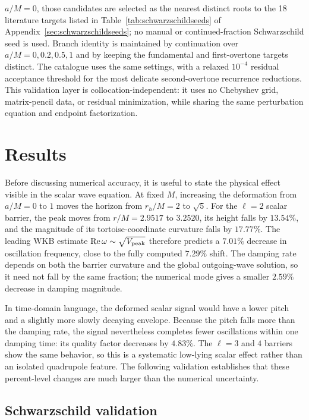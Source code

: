 \documentclass[12pt,a4paper]{article}
\begin{document}
\(a/M=0\), those candidates are selected as the nearest distinct roots to the
18 literature targets listed in Table~\ref{tab:schwarzschildseeds} of
Appendix~\ref{sec:schwarzschildseeds}; no
manual or continued-fraction Schwarzschild seed is used. Branch
identity is maintained by continuation over \(a/M=0,0.2,0.5,1\) and by keeping
the fundamental and first-overtone targets distinct.  The catalogue uses the
same settings, with a relaxed \(10^{-4}\) residual acceptance threshold for the
most delicate second-overtone recurrence reductions. This validation layer is
collocation-independent: it uses no Chebyshev grid, matrix-pencil data, or residual
minimization, while sharing the same perturbation equation and endpoint
factorization.

\section{Results}

Before discussing numerical accuracy, it is useful to state the physical
effect visible in the scalar wave equation.  At fixed \(M\), increasing the
deformation from \(a/M=0\) to \(1\) moves the horizon from \(r_h/M=2\) to
\(\sqrt{5}\).  For the \(\ell=2\) scalar barrier, the peak moves from
\(r/M=2.9517\) to \(3.2520\), its height falls by \(13.54\%\), and the
magnitude of its tortoise-coordinate curvature falls by \(17.77\%\).  The
leading WKB estimate \(\operatorname{Re}\omega\sim\sqrt{V_{\rm peak}}\)
therefore predicts a \(7.01\%\) decrease in oscillation frequency, close to
the fully computed \(7.29\%\) shift.  The damping rate depends on both the
barrier curvature and the global outgoing-wave solution, so it need not fall
by the same fraction; the numerical mode gives a smaller \(2.59\%\) decrease
in damping magnitude.

In time-domain language, the deformed scalar signal would have a lower pitch
and a slightly more slowly decaying envelope.  Because the pitch falls more
than the damping rate, the signal nevertheless completes fewer oscillations
within one damping time: its quality factor decreases by \(4.83\%\).  The
\(\ell=3\) and \(4\) barriers show the same behavior, so this is a systematic
low-lying scalar effect rather than an isolated quadrupole feature.  The
following validation establishes that these percent-level changes are much
larger than the numerical uncertainty.

\subsection{Schwarzschild validation}
\end{document}
